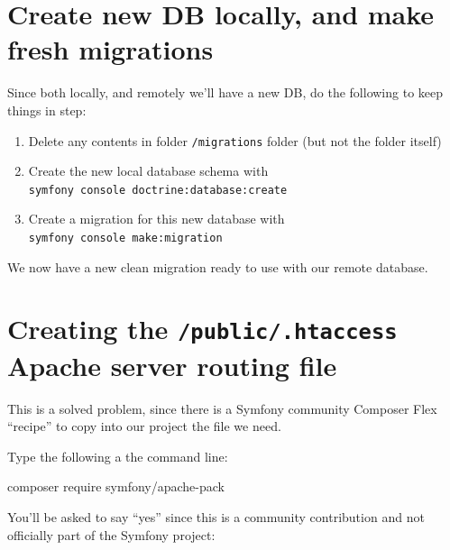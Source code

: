 \documentclass[a4paperpaper,openright]{book}
\newenvironment{Shaded}{}{}
\newcommand{\ExtensionTok}[1]{#1}
\newcommand{\NormalTok}[1]{#1}
\begin{document}
\hypertarget{create-new-db-locally-and-make-fresh-migrations}{%
\section{Create new DB locally, and make fresh
migrations}\label{create-new-db-locally-and-make-fresh-migrations}}

Since both locally, and remotely we'll have a new DB, do the following
to keep things in step:

\begin{enumerate}
\def\labelenumi{\arabic{enumi}.}
\item
  Delete any contents in folder \texttt{/migrations} folder (but not the
  folder itself)
\item
  Create the new local database schema with
  \texttt{symfony\ console\ doctrine:database:create}
\item
  Create a migration for this new database with
  \texttt{symfony\ console\ make:migration}
\end{enumerate}

We now have a new clean migration ready to use with our remote database.

\hypertarget{creating-the-public.htaccess-apache-server-routing-file}{%
\section{\texorpdfstring{Creating the \texttt{/public/.htaccess} Apache
server routing
file}{Creating the /public/.htaccess Apache server routing file}}\label{creating-the-public.htaccess-apache-server-routing-file}}

This is a solved problem, since there is a Symfony community Composer
Flex ``recipe'' to copy into our project the file we need.

Type the following a the command line:

\begin{Shaded}
\begin{Highlighting}[]
    \ExtensionTok{composer}\NormalTok{ require symfony/apache-pack}
\end{Highlighting}
\end{Shaded}

You'll be asked to say ``yes'' since this is a community contribution
and not officially part of the Symfony project:
\end{document}
